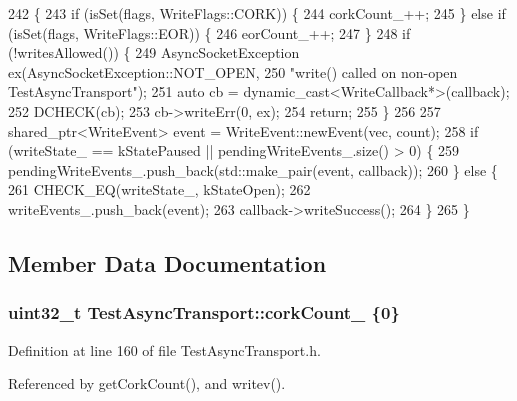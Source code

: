 \begin{DoxyCode}
242                                              \{
243   \textcolor{keywordflow}{if} (isSet(flags, WriteFlags::CORK)) \{
244     corkCount_++;
245   \} \textcolor{keywordflow}{else} \textcolor{keywordflow}{if} (isSet(flags, WriteFlags::EOR)) \{
246     eorCount_++;
247   \}
248   \textcolor{keywordflow}{if} (!writesAllowed()) \{
249     AsyncSocketException ex(AsyncSocketException::NOT\_OPEN,
250                            \textcolor{stringliteral}{"write() called on non-open TestAsyncTransport"});
251     \textcolor{keyword}{auto} cb = \textcolor{keyword}{dynamic\_cast<}WriteCallback*\textcolor{keyword}{>}(callback);
252     DCHECK(cb);
253     cb->writeErr(0, ex);
254     \textcolor{keywordflow}{return};
255   \}
256 
257   shared\_ptr<WriteEvent> \textcolor{keyword}{event} = WriteEvent::newEvent(vec, count);
258   \textcolor{keywordflow}{if} (writeState_ == kStatePaused || pendingWriteEvents_.size() > 0)  \{
259     pendingWriteEvents_.push\_back(std::make\_pair(event, callback));
260   \} \textcolor{keywordflow}{else} \{
261     CHECK\_EQ(writeState_, kStateOpen);
262     writeEvents_.push\_back(event);
263     callback->writeSuccess();
264   \}
265 \}
\end{DoxyCode}


\subsection{Member Data Documentation}
\subsubsection[{cork\+Count\+\_\+}]{\setlength{\rightskip}{0pt plus 5cm}uint32\+\_\+t Test\+Async\+Transport\+::cork\+Count\+\_\+ \{0\}\hspace{0.3cm}{\ttfamily [private]}}\label{classTestAsyncTransport_a9a8e914efb90cdeb46f45a361f3b3b6d}


Definition at line 160 of file Test\+Async\+Transport.\+h.



Referenced by get\+Cork\+Count(), and writev().

